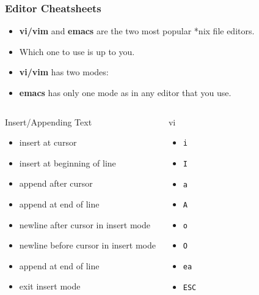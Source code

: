 \documentclass[10pt,t]{beamer}
\begin{document}
\begin{frame}[allowframebreaks]
  \frametitle{\small Editor Cheatsheets}
  \begin{itemize}
    \item \textbf{\color{lubrown}vi/vim} and \textbf{\color{lubrown}emacs} are the two most popular *nix file editors.
    \item Which one to use is up to you.
    \item \textbf{\color{lubrown}vi/vim} has two modes:
    \item \textbf{\color{lubrown}emacs} has only one mode as in any editor that you use.
  \end{itemize}
  {\scriptsize
  \begin{columns}[t]
    \begin{exampleblock}{Insert/Appending Text}
    \begin{itemize}
      \item insert at cursor 
      \item insert at beginning of line
      \item append after cursor
      \item append at end of line
      \item newline after cursor in insert mode
      \item newline before cursor in insert mode
      \item append at end of line
      \item exit insert mode
    \end{itemize}
    \end{exampleblock}
    \begin{exampleblock}{vi}
    \begin{itemize}
      \item \texttt{i}
      \item \texttt{I}
      \item \texttt{a}
      \item \texttt{A}
      \item \texttt{o}
      \item \texttt{O}
      \item \texttt{ea}
      \item \texttt{ESC}

\end{itemize}
\end{exampleblock}
\end{columns}}
\end{frame}
\end{document}
